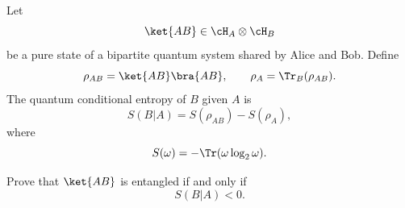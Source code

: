 Let
$$
\ket{AB}\in \cH_A\otimes \cH_B
$$
be a pure state of a bipartite quantum system shared by Alice and Bob. Define
$$
\rho_{AB}=\ket{AB}\bra{AB},
\qquad
\rho_A=\Tr_B(\rho_{AB}).
$$
The quantum conditional entropy of $B$ given $A$ is
$$
S(B|A)
=
S(\rho_{AB})-S(\rho_A),
$$
where
$$
S(\omega)=-\Tr(\omega\log_2 \omega).
$$

Prove that $\ket{AB}$ is entangled if and only if
$$
S(B|A)<0.
$$
